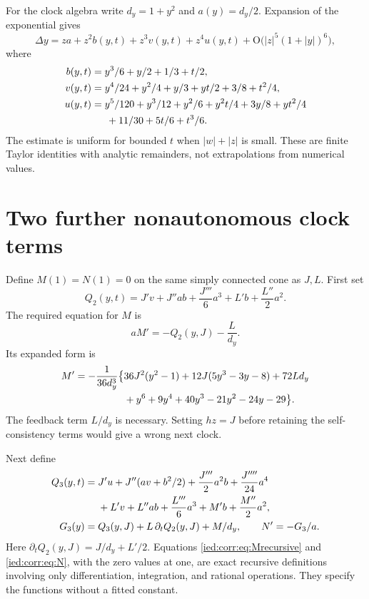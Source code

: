 \documentclass[11pt,letterpaper]{article}
\theoremstyle{remark}\newtheorem{remark}[theorem]{Remark}
\newcommand{\Oh}{\mathrm O}\newcommand{\supp}{\operatorname{supp}}
\begin{document}
For the clock algebra write $d_y=1+y^2$ and $a(y)=d_y/2$. Expansion of the exponential gives
\begin{equation}\label{ied:corr:eq:ystep}
 \Delta y=za+z^2b(y,t)+z^3v(y,t)+z^4u(y,t)
           +\Oh\bigl(|z|^5(1+|y|)^6\bigr),
\end{equation}
where
\begin{align}\label{ied:corr:eq:stepcoeffs}
 b(y,t)&=y^3/6+y/2+1/3+t/2,\notag\\
 v(y,t)&=y^4/24+y^2/4+y/3+yt/2+3/8+t^2/4,\\
 u(y,t)&=y^5/120+y^3/12+y^2/6+y^2t/4+3y/8+yt^2/4\notag\\
       &\hspace{1.5em}+11/30+5t/6+t^3/6.\notag
\end{align}
The estimate is uniform for bounded $t$ when $|w|+|z|$ is small. These are finite Taylor identities with analytic remainders, not extrapolations from numerical values.

\section{Two further nonautonomous clock terms}\label{ied:corr:sec:clocks}
Define $M(1)=N(1)=0$ on the same simply connected cone as $J,L$. First set
\begin{equation}\label{ied:corr:eq:Q2}
 Q_2(y,t)=J'v+J''ab+\frac{J'''}6a^3+L'b+\frac{L''}2a^2.
\end{equation}
The required equation for $M$ is
\begin{equation}\label{ied:corr:eq:Mrecursive}
 aM'=-Q_2(y,J)-\frac{L}{d_y}.
\end{equation}
Its expanded form is
\begin{align}\label{ied:corr:eq:M}
 M'=-\frac1{36d_y^3}\bigl\{&36J^2(y^2-1)+12J(5y^3-3y-8)+72Ld_y\\
 &+y^6+9y^4+40y^3-21y^2-24y-29\bigr\}.\notag
\end{align}
The feedback term $L/d_y$ is necessary. Setting $hz=J$ before retaining the self-consistency terms would give a wrong next clock.

Next define
\begin{align}\label{ied:corr:eq:Q3}
 Q_3(y,t)={}&J'u+J''(av+b^2/2)+\frac{J'''}2a^2b+\frac{J''''}{24}a^4\notag\\
 &+L'v+L''ab+\frac{L'''}6a^3+M'b+\frac{M''}2a^2,\\
 G_3(y)={}&Q_3(y,J)+L\,\partial_t Q_2(y,J)+M/d_y,
 \qquad N'=-G_3/a.\label{ied:corr:eq:N}
\end{align}
Here $\partial_tQ_2(y,J)=J/d_y+L'/2$. Equations \eqref{ied:corr:eq:Mrecursive} and \eqref{ied:corr:eq:N}, with the zero values at one, are exact recursive definitions involving only differentiation, integration, and rational operations. They specify the functions without a fitted constant.
\end{document}
